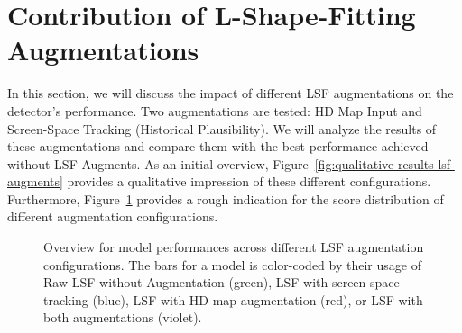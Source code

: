 
\section{Contribution of L-Shape-Fitting Augmentations}
\label{sec:lsf-aug-impact}

In this section, we will discuss the impact of different LSF augmentations on the detector's performance.
Two augmentations are tested: HD Map Input and Screen-Space Tracking (Historical Plausibility).
We will analyze the results of these augmentations and compare them with the best performance achieved without LSF Augments.
As an initial overview, Figure~\ref{fig:qualitative-results-lsf-augments} provides a qualitative impression of these different configurations.
Furthermore, Figure~\ref{fig:lsf-augmentations-overview} provides a rough indication for the score distribution of different augmentation configurations.

\begin{figure}[h!]
    
    \caption{Overview for model performances across different LSF augmentation configurations. The bars for a model is color-coded by their usage of Raw LSF without Augmentation (green), LSF with screen-space tracking (blue), LSF with HD map augmentation (red), or LSF with both augmentations (violet). }
    \label{fig:lsf-augmentations-overview}
\end{figure}

